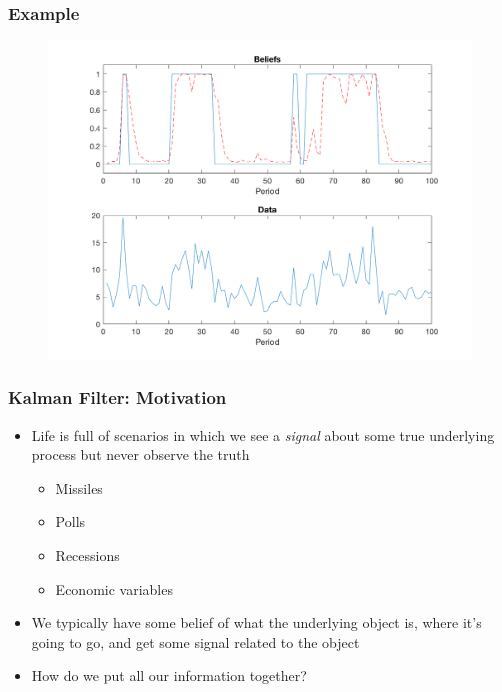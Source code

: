 \documentclass{beamer}
\begin{document}
\begin{frame}
\frametitle[alignment=center]{Example}
\begin{figure}
\centering
\includegraphics[scale=0.5]{Markov6.png}
\end{figure}
\end{frame}

\begin{frame}
\frametitle[alignment=center]{Kalman Filter: Motivation}
\begin{itemize}
\item Life is full of scenarios in which we see a \emph{signal} about some true underlying process but never observe the truth
\bigskip
\begin{itemize}
\item Missiles
\bigskip
\item Polls
\bigskip
\item Recessions
\bigskip
\item Economic variables
\bigskip
\end{itemize}
\item We typically have some belief of what the underlying object is, where it's going to go, and get some signal related to the object
\bigskip
\item How do we put all our information together?
\end{itemize}
\end{frame}

\end{document}
